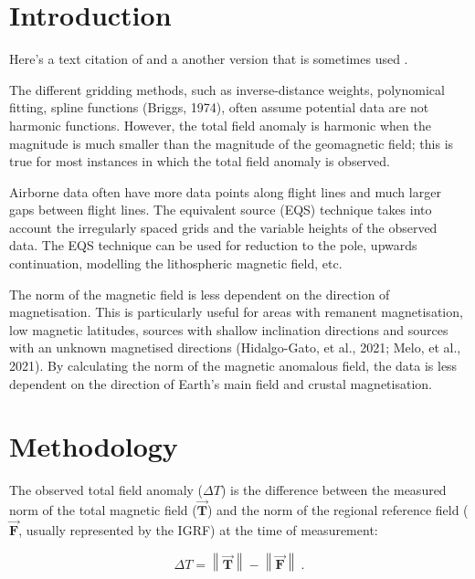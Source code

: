 
\section{Introduction}

Here's a text citation of \citet{OliveiraJr2015}
and a another version that is sometimes used \citep{OliveiraJr2015}.

The different gridding methods, such as inverse-distance weights, polynomical fitting, spline functions (Briggs, 1974), often assume potential data are not harmonic functions. However, the total field anomaly is harmonic when the magnitude is much smaller than the magnitude of the geomagnetic field; this is true for most instances in which the total field anomaly is observed. 

Airborne data often have more data points along flight lines and much larger gaps between flight lines. The equivalent source (EQS) technique takes into account the irregularly spaced grids and the variable heights of the observed data. The EQS technique can be used for reduction to the pole, upwards continuation, modelling the lithospheric magnetic field, etc.

The norm of the magnetic field is less dependent on the direction of magnetisation. This is particularly useful for areas with remanent magnetisation, low magnetic latitudes, sources with shallow inclination directions and sources with an unknown magnetised directions (Hidalgo-Gato, et al., 2021; Melo, et al., 2021). By calculating the norm of the magnetic anomalous field, the data is less dependent on the direction of Earth’s main field and crustal magnetisation.

\lipsum[1-4]



\section{Methodology}

The observed total field anomaly ($\Delta T$) is the difference between the measured norm of the total magnetic field ($\vec{\mathbf{T}}$) and the norm of the regional reference field ($\vec{\mathbf{F}}$, usually represented by the IGRF) at the time of measurement:

\begin{equation}
    \Delta T = \left\lVert \vec{\mathbf{T}} \right\rVert - \left\lVert \vec{\mathbf{F}} \right\rVert
    \ .
\end{equation}

